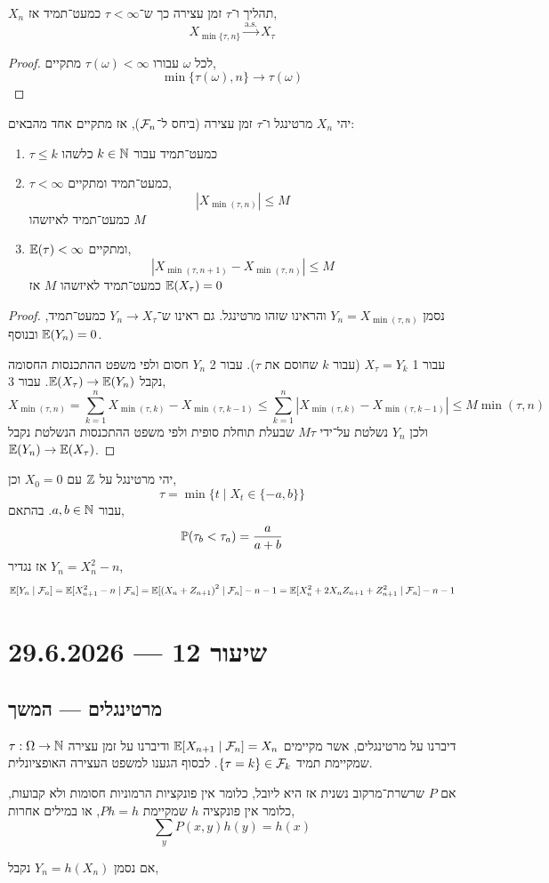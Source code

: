 \begin{proposition}
	$X_n$ תהליך ו־$\tau$ זמן עצירה כך ש־$\tau < \infty$ כמעט־תמיד אז,
	\[
		X_{\min\{\tau, n\}}
		\xrightarrow{\text{a.s.}}
		X_{\tau}
	\]
\end{proposition}
\begin{proof}
	לכל $\omega$ עבורו $\tau(\omega) < \infty$ מתקיים,
	\[
		\min\{ \tau(\omega), n \}
		\to \tau(\omega)
	\]
\end{proof}
\begin{theorem}
	יהי $X_n$ מרטינגל ו־$\tau$ זמן עצירה (ביחס ל־$\mathcal{F}_n$), אז מתקיים אחד מהבאים:
	\begin{enumerate}
		\item $\tau \le k$ כמעט־תמיד עבור $k \in \mathbb{N}$ כלשהו
		\item $\tau < \infty$ כמעט־תמיד ומתקיים,
			\[
				|X_{\min(\tau, n)}| \le M
			\]
			כמעט־תמיד לאיזשהו $M$
		\item $\mathbb{E}(\tau) < \infty$ ומתקיים,
			\[
				|X_{\min(\tau, n + 1)} - X_{\min(\tau, n)}| \le M
			\]
			כמעט־תמיד לאיזשהו $M$ אז $\mathbb{E}(X_{\tau}) = 0$
	\end{enumerate}
\end{theorem}
\begin{proof}
	נסמן $Y_n = X_{\min(\tau, n)}$ והראינו שזהו מרטינגל.
	גם ראינו ש־$Y_n \to X_{\tau}$ כמעט־תמיד, ובנוסף $\mathbb{E}(Y_n) = 0$.
	
	עבור 1 $X_{\tau} = Y_k$ (עבור $k$ שחוסם את $\tau$).
	עבור 2 $Y_n$ חסום ולפי משפט ההתכנסות החסומה נקבל $\mathbb{E}(X_{\tau}) \to \mathbb{E}(Y_n)$.
	עבור 3,
	\[
		X_{\min(\tau, n)}
		= \sum_{k = 1}^n X_{\min(\tau, k)} - X_{\min(\tau, k - 1)}
		\le \sum_{k = 1}^n |X_{\min(\tau, k)} - X_{\min(\tau, k - 1)}|
		\le M \min(\tau, n)
	\]
	ולכן $Y_n$ נשלטת על־ידי $M \tau$ שבעלת תוחלת סופית ולפי משפט ההתכנסות הנשלטת נקבל $\mathbb{E}(Y_n) \to \mathbb{E}(X_{\tau})$.
\end{proof}
יהי מרטינגל על $\mathbb{Z}$ עם $X_0 = 0$ וכן,
\[
	\tau = \min\{ t \mid X_t \in \{-a, b\} \}
\]
עבור $a, b \in \mathbb{N}$.
בהתאם,
\[
	\mathbb{P}(\tau_b < \tau_a)
	= \frac{a}{a + b}
\]
אז נגדיר $Y_n = X_n^2 - n$,
\[
	\mathbb{E}[Y_n \mid \mathcal{F}_n]
	= \mathbb{E}[X_{n + 1}^2 - n \mid \mathcal{F}_n]
	= \mathbb{E}[{(X_n + Z_{n + 1})}^2 \mid \mathcal{F}_n] - n - 1
	= \mathbb{E}[X_n^2 + 2 X_n Z_{n + 1} + Z_{n + 1}^2 \mid \mathcal{F}_n] - n - 1
\]

\section{שיעור 12 --- 29.6.2026}
\subsection{מרטינגלים --- המשך}
דיברנו על מרטינגלים, אשר מקיימים $\mathbb{E}[X_{n + 1} \mid \mathcal{F}_n] = X_n$ ודיברנו על זמן עצירה $\tau : \Omega \to \mathbb{N}$ שמקיימת תמיד $\{ \tau = k \} \in \mathcal{F}_k$.
לבסוף הגענו למשפט העצירה האופציונלית.
\begin{corollary}
	אם $P$ שרשרת־מרקוב נשנית אז היא ליובל,
	כלומר אין פונקציות הרמוניות חסומות ולא קבועות, כלומר אין פונקציה $h$ שמקיימת $Ph = h$, או במילים אחרות,
	\[
		\sum_y P(x, y) h(y)
		= h(x)
	\]
\end{corollary}
אם נסמן $Y_n = h(X_n)$ נקבל,

